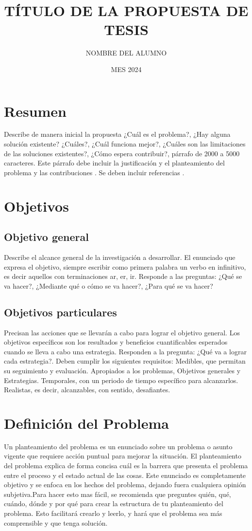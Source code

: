 \documentclass[letterpaper,12pt,oneside]{article}
\title{TÍTULO DE LA PROPUESTA DE TESIS}
\author{NOMBRE DEL ALUMNO}
\date{MES 2024}
\begin{document}
\maketitle

\section*{Resumen}
Describe de manera inicial la propuesta ¿Cuál es el problema?, ¿Hay alguna solución existente? ¿Cuáles?, ¿Cuál funciona mejor?, ¿Cuáles son las limitaciones de las soluciones existentes?, ¿Cómo espera contribuir?, párrafo de 2000 a 5000 caracteres. Este párrafo debe incluir la justificación y el planteamiento del problema y las contribuciones \cite{phil99}. Se deben incluir referencias \cite{smit54, jame76}.

\section{Objetivos}

\subsection{Objetivo general}
Describe el alcance general de la investigación a desarrollar. El enunciado que expresa el objetivo, siempre escribir como primera palabra un verbo en infinitivo, es decir aquellos con terminaciones ar, er, ir. Responde a las preguntas: ¿Qué se va hacer?, ¿Mediante qué o cómo se va hacer?, ¿Para qué se va hacer?

\subsection{Objetivos particulares}
Precisan las acciones que se llevarán a cabo para lograr el objetivo general. Los objetivos específicos son los resultados y beneficios cuantificables esperados cuando se lleva a cabo una estrategia. Responden a la pregunta: ¿Qué va a lograr cada estrategia?. Deben cumplir los siguientes requisitos: Medibles, que permitan su seguimiento y evaluación. Apropiados a los problemas, Objetivos generales y Estrategias. Temporales, con un periodo de tiempo específico para alcanzarlos. Realistas, es decir, alcanzables, con sentido, desafiantes.

\section{Definición del Problema}
Un planteamiento del problema es un enunciado sobre un problema o asunto vigente que requiere acción puntual para mejorar la situación. El planteamiento del problema explica de forma concisa cuál es la barrera que presenta el problema entre el proceso y el estado actual de las cosas. Este enunciado es completamente objetivo y se enfoca en los hechos del problema, dejando fuera cualquiera opinión subjetiva.Para hacer esto mas fácil, se recomienda que preguntes quién, qué, cuándo, dónde y por qué para crear la estructura de tu planteamiento del problema. Esto facilitará crearlo y leerlo, y hará que el problema sea más comprensible y que tenga solución.
\end{document}
